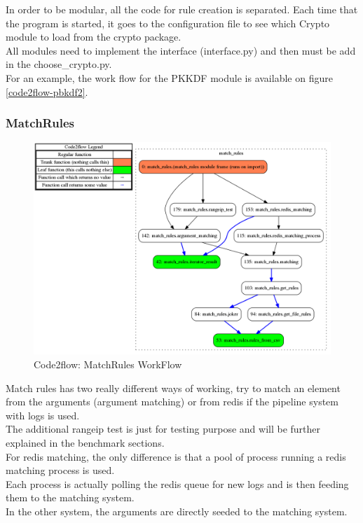\documentclass{eplmastersthesis}
\begin{document}
In order to be modular, all the code for rule creation is separated. Each time that the program is started, it goes to the configuration file to see which Crypto module to load from the crypto package.\\
All modules need to implement the interface (interface.py) and then must be add in the choose\_crypto.py.\\
For an example, the work flow for the PKKDF module is available on figure \ref{code2flow-pbkdf2}.

\subsubsection{MatchRules}
\begin{figure}[h!]
\begin{center}
	\includegraphics[scale=0.3]{res/flowMatchRules}
	\caption{Code2flow: MatchRules WorkFlow}
	\label{code2flow-matchRules}
\end{center}
\end{figure}

Match rules has two really different ways of working, try to match an element from the arguments (argument matching) or from redis if the pipeline system with logs is used.\\
The additional rangeip test is just for testing purpose and will be further explained in the benchmark sections.\\

For redis matching, the only difference is that a pool of process running a redis matching process is used.\\
Each process is actually polling the redis queue for new logs and is then feeding them to the matching system.\\
In the other system, the arguments are directly seeded to the matching system.\\
\end{document}
